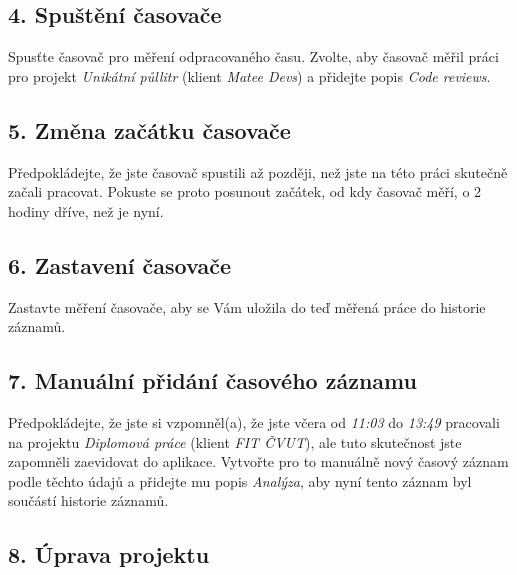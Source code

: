 \subsection*{4. Spuštění časovače}

Spusťte časovač pro měření odpracovaného času. Zvolte, aby časovač měřil práci pro projekt \emph{Unikátní půllitr} (klient \emph{Matee Devs}) a přidejte popis \emph{Code reviews}.

\subsection*{5. Změna začátku časovače}

Předpokládejte, že jste časovač spustili až později, než jste na této práci skutečně začali pracovat. Pokuste se proto posunout začátek, od kdy časovač měří, o 2 hodiny dříve, než je nyní.

\subsection*{6. Zastavení časovače}

Zastavte měření časovače, aby se Vám uložila do teď měřená práce do historie záznamů.

\subsection*{7. Manuální přidání časového záznamu}

Předpokládejte, že jste si vzpomněl(a), že jste včera od \emph{11:03} do \emph{13:49} pracovali na projektu \emph{Diplomová práce} (klient \emph{FIT ČVUT}), ale tuto skutečnost jste zapomněli zaevidovat do aplikace. Vytvořte pro to manuálně nový časový záznam podle těchto údajů a přidejte mu popis \emph{Analýza}, aby nyní tento záznam byl součástí historie záznamů.

\subsection*{8. Úprava projektu}

